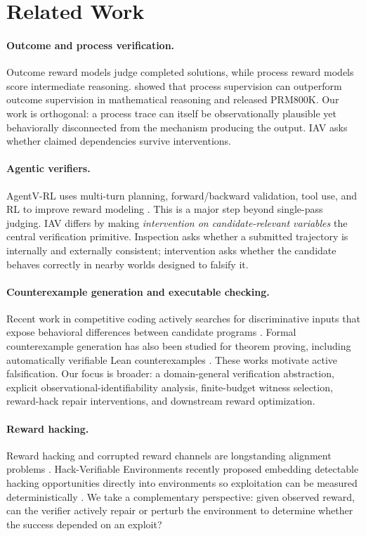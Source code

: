 \documentclass[10pt]{article}
\begin{document}
\section{Related Work}

\paragraph{Outcome and process verification.}
Outcome reward models judge completed solutions, while process reward models score intermediate reasoning. \citet{lightman2023verify} showed that process supervision can outperform outcome supervision in mathematical reasoning and released PRM800K. Our work is orthogonal: a process trace can itself be observationally plausible yet behaviorally disconnected from the mechanism producing the output. IAV asks whether claimed dependencies survive interventions.

\paragraph{Agentic verifiers.}
AgentV-RL uses multi-turn planning, forward/backward validation, tool use, and RL to improve reward modeling \citep{zhang2026agentv}. This is a major step beyond single-pass judging. IAV differs by making \emph{intervention on candidate-relevant variables} the central verification primitive. Inspection asks whether a submitted trajectory is internally and externally consistent; intervention asks whether the candidate behaves correctly in nearby worlds designed to falsify it.

\paragraph{Counterexample generation and executable checking.}
Recent work in competitive coding actively searches for discriminative inputs that expose behavioral differences between candidate programs \citep{ma2026coding}. Formal counterexample generation has also been studied for theorem proving, including automatically verifiable Lean counterexamples \citep{li2026disprove}. These works motivate active falsification. Our focus is broader: a domain-general verification abstraction, explicit observational-identifiability analysis, finite-budget witness selection, reward-hack repair interventions, and downstream reward optimization.

\paragraph{Reward hacking.}
Reward hacking and corrupted reward channels are longstanding alignment problems \citep{everitt2017corrupted}. Hack-Verifiable Environments recently proposed embedding detectable hacking opportunities directly into environments so exploitation can be measured deterministically \citep{roth2026hack}. We take a complementary perspective: given observed reward, can the verifier actively repair or perturb the environment to determine whether the success depended on an exploit?
\end{document}
